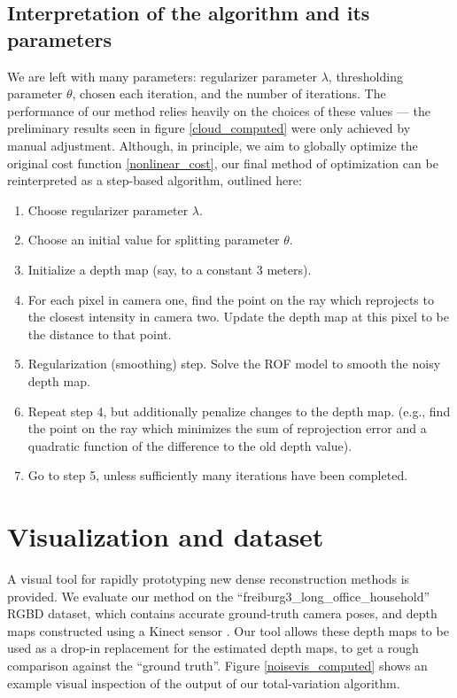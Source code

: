 \documentclass[conference]{IEEEtran}
\begin{document}
\subsection{Interpretation of the algorithm and its parameters}
We are left with many parameters: regularizer parameter $\lambda$, thresholding parameter $\theta$, chosen each iteration, and the number of iterations.
The performance of our method relies heavily on the choices of these values --- the preliminary results seen in figure \ref{cloud_computed}
were only achieved by manual adjustment. Although, in principle, we aim to globally optimize the original cost function \eqref{nonlinear_cost},
our final method of optimization can be reinterpreted as a step-based algorithm, outlined here:
\begin{enumerate}
    \item Choose regularizer parameter $\lambda$.
    \item Choose an initial value for splitting parameter $\theta$.
    \item Initialize a depth map (say, to a constant 3 meters).
    \item For each pixel in camera one, find the point on the ray which reprojects to the closest intensity in camera two.
          Update the depth map at this pixel to be the distance to that point.
    \item Regularization (smoothing) step. Solve the ROF model to smooth the noisy depth map.
    \item Repeat step 4, but additionally penalize changes to the depth map.
         (e.g., find the point on the ray which minimizes the sum of reprojection error and a quadratic function of the difference to the old depth value).
    \item Go to step 5, unless sufficiently many iterations have been completed.
\end{enumerate}



\section{Visualization and dataset}
A visual tool for rapidly prototyping new dense reconstruction methods is provided.
We evaluate our method on the ``freiburg3\_long\_office\_household'' RGBD dataset, which contains accurate ground-truth camera poses, and
depth maps constructed using a Kinect sensor \cite{dataset} \cite{largescale}. Our tool allows these depth maps to be used as a drop-in replacement for the estimated
depth maps, to get a rough comparison against the ``ground truth''. Figure \ref{noisevis_computed} shows an example visual inspection of the output
of our total-variation algorithm.
\end{document}
